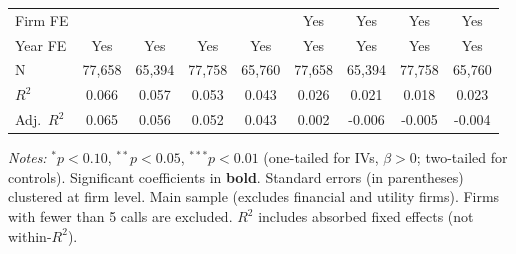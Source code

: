 \documentclass[11pt,a4paper]{article}
\begin{document}
\begin{table}[htbp]
\begin{tabular}{lcccccccc}
Firm FE &  &  &  &  & Yes & Yes & Yes & Yes \\
Year FE & Yes & Yes & Yes & Yes & Yes & Yes & Yes & Yes \\
\midrule
N & 77,658 & 65,394 & 77,758 & 65,760 & 77,658 & 65,394 & 77,758 & 65,760 \\
$R^2$ & 0.066 & 0.057 & 0.053 & 0.043 & 0.026 & 0.021 & 0.018 & 0.023 \\
Adj.~$R^2$ & 0.065 & 0.056 & 0.052 & 0.043 & 0.002 & -0.006 & -0.005 & -0.004 \\
\bottomrule
\end{tabular}
\begin{minipage}{\linewidth}
\vspace{2pt}\scriptsize
\textit{Notes:} $^{*}p<0.10$, $^{**}p<0.05$, $^{***}p<0.01$ (one-tailed for IVs, $\beta > 0$; two-tailed for controls).
 Significant coefficients in \textbf{bold}.
 Standard errors (in parentheses) clustered at firm level.
 Main sample (excludes financial and utility firms). Firms with fewer than 5 calls are excluded.
 $R^2$ includes absorbed fixed effects (not within-$R^2$).
\end{minipage}
\end{table}
\clearpage
\end{document}
